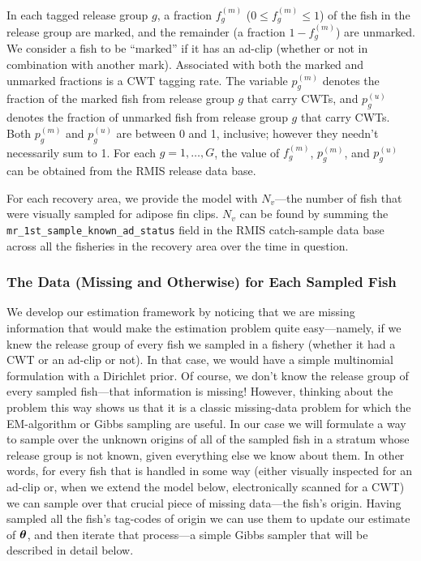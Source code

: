 \documentclass[11pt]{article}
\def\bm#1{\mathpalette\bmstyle{#1}}
\def\bmstyle#1#2{\mbox{\boldmath$#1#2$}}
\newcommand{\btheta}{\bm{\theta}}
\begin{document}
In each tagged release group $g$, a fraction $f^{(m)}_g$ ($0\leq f^{(m)}_g \leq 1$)
of the fish in the release group are marked,
and the remainder (a fraction $1-f^{(m)}_g$) are unmarked. We consider a fish to be 
``marked'' if it has an ad-clip (whether or
not in combination with another mark).   Associated with both the marked and unmarked
fractions is a CWT tagging rate.  The variable $p^{(m)}_g$ denotes the
fraction of the marked fish from release group $g$ that carry CWTs, and $p^{(u)}_g$ denotes the fraction
of unmarked fish from release group $g$ that carry CWTs. Both $p^{(m)}_g$ and  $p^{(u)}_g$ are between
0 and 1, inclusive; however they needn't necessarily sum to 1.  For each $g=1,\ldots,G$, the value of
$f^{(m)}_g$, $p^{(m)}_g$, and $p^{(u)}_g$ can be obtained
from the RMIS release data base.

For each recovery area, we provide the model with $N_v$---the number of fish that were
visually sampled for adipose fin clips.  $N_v$ can be found by summing the {\tt mr\_1st\_sample\_known\_ad\_status} field in the RMIS catch-sample data base across all the fisheries in the recovery area over the
time in question.  

\subsubsection{The Data (Missing and Otherwise) for Each Sampled Fish}
We develop our estimation framework by noticing that we are missing information
that would make the estimation problem quite easy---namely, if we knew the release group of every
fish we sampled in a fishery (whether it had a CWT or an ad-clip or not).  In that case, we would have a simple multinomial
formulation with a Dirichlet prior.  Of course, we don't know the release group of every sampled
fish---that information is missing!  However, thinking about the problem this way shows us that it is a classic
missing-data problem for which the EM-algorithm or Gibbs sampling are useful.  In our case we will
formulate a way to sample over the unknown origins of all of the sampled fish in a stratum whose release group
is not known, given 
everything else we know about them.
In other words, for every fish that is handled in some way (either visually inspected for an ad-clip or,
when we extend the model below,
electronically scanned for a CWT) we can sample over that crucial piece of missing data---the fish's origin.
Having sampled all the fish's tag-codes of origin we can use them to update our estimate of
$\btheta$, and then iterate that process---a simple Gibbs sampler that will be described in detail below.
\end{document}
